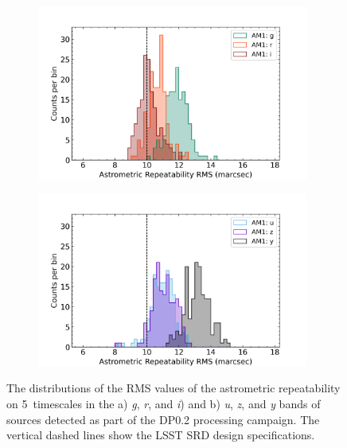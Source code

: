 \begin{figure}[ht]
\begin{subfigure}{.5\textwidth}
    \centering
    \includegraphics[width=0.98\textwidth]{figures/dp02_am1_alltracts_gri}
\end{subfigure}
\begin{subfigure}{.5\textwidth}
    \centering
    \includegraphics[width=0.98\textwidth]{figures/dp02_am1_alltracts_uzy}
\end{subfigure}
\par\medskip
\caption[short]{\label{fig:faro_dp02_distr_am1}
The distributions of the RMS values of the astrometric repeatability on 5\arcmin\, timescales  in the a) \emph{g}, \emph{r}, and \emph{i})  and  b) \emph{u}, \emph{z}, and \emph{y} bands of sources detected as part of the DP0.2 processing campaign.
The vertical dashed lines show the LSST SRD design specifications. }
\end{figure}

